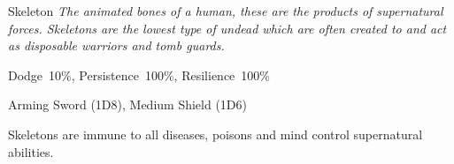 \begin{monsterbox}{Skeleton}
	\textit{The animated bones of a human, these are the products of supernatural forces. Skeletons are the lowest type of undead which are often created to and act as disposable warriors and tomb guards.}\\
	\rpghline
	\basics[%
        hitpoints  = 8, 
	majorwound = 4,
	damagemodifier = 0,
	powerpoints = 0,
	movementrate = 15m,
	armor = Leather (2AP),
	plunderrating = 0
	]
	\rpghline%
	\stats[ %
		STR = 2D6+6 (13),
		CON = 1D6   (4),
		DEX = 3D6   (11),
		SIZ = 3D6   (11),
		INT = 0     (0),
		POW = 0     (0),
		CHA = 0     (0)
	]
	\rpghline%
	\begin{rpg-monsteraction}[Resistances]
		Dodge~10\%, Persistence~100\%, Resilience~100\%
	\end{rpg-monsteraction}
	\begin{rpg-monsteraction}
		Arming Sword (1D8), Medium Shield (1D6)
	\end{rpg-monsteraction}
	\begin{rpg-monsteraction}[Immunities]
		Skeletons are immune to all diseases, poisons and mind control supernatural abilities.
	\end{rpg-monsteraction}

\end{monsterbox}

\newpage

